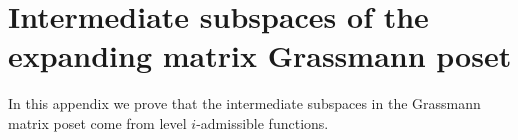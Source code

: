 
\section{Intermediate subspaces of the expanding matrix Grassmann poset} \label{app:admissible-functions-structure-proof}
In this appendix we prove that the intermediate subspaces in the Grassmann matrix poset come from level \(i\)-admissible functions.

